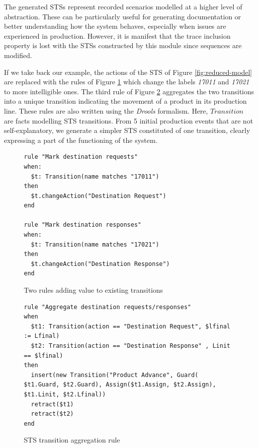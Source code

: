 The generated STSs represent recorded scenarios modelled at a
higher level of abstraction. These can be particularly useful for
generating documentation or better understanding how the system
behaves, especially when issues are experienced in production.
However, it is manifest that the trace inclusion property is lost
with the STSs constructed by this module since sequences are
modified.

If we take back our example, the actions of the STS of Figure
\ref{fig:reduced-model} are replaced with the rules of Figure
\ref{rule:rename-tr} which change the labels \textit{17011} and
\textit{17021} to more intelligible ones. The third rule of
Figure \ref{rule:aggregate-tr} aggregates the two transitions
into a unique transition indicating the movement of a product in
its production line. These rules are also written using the
\textit{Drools} formalism. Here, $Transition$ are facts modelling
STS transitions. From 5 initial production events that are not
self-explanatory, we generate a simpler STS constituted of one
transition, clearly expressing a part of the functioning of the
system.

\begin{figure}[H]
\begin{lstlisting}
rule "Mark destination requests"
when:
  $t: Transition(name matches "17011")
then
  $t.changeAction("Destination Request")
end

rule "Mark destination responses"
when:
  $t: Transition(name matches "17021")
then
  $t.changeAction("Destination Response")
end
\end{lstlisting}

    \caption{Two rules adding value to existing transitions}
    \label{rule:rename-tr}
\end{figure}

\begin{figure}[H]
\begin{lstlisting}
rule "Aggregate destination requests/responses"
when
  $t1: Transition(action == "Destination Request", $lfinal := Lfinal)
  $t2: Transition(action == "Destination Response" , Linit == $lfinal)
then
  insert(new Transition("Product Advance", Guard( $t1.Guard, $t2.Guard), Assign($t1.Assign, $t2.Assign), $t1.Linit, $t2.Lfinal))
  retract($t1)
  retract($t2)
end
\end{lstlisting}

    \caption{STS transition aggregation rule}
    \label{rule:aggregate-tr}
\end{figure}



